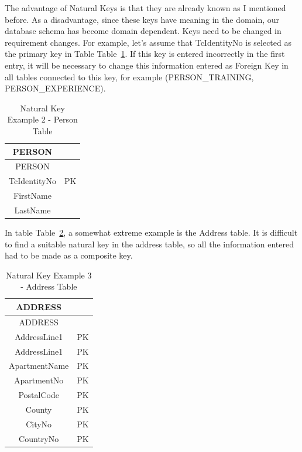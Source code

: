 \documentclass[
  letterpaper,
  DIV=11,
  numbers=noendperiod]{scrreprt}
\begin{document}
The advantage of Natural Keys is that they are already known as I
mentioned before. As a disadvantage, since these keys have meaning in
the domain, our database schema has become domain dependent. Keys need
to be changed in requirement changes. For example, let's assume that
TcIdentityNo is selected as the primary key in Table
Table~\ref{tbl-table-primary-key-natural-key-example-person}. If this
key is entered incorrectly in the first entry, it will be necessary to
change this information entered as Foreign Key in all tables connected
to this key, for example (PERSON\_TRAINING, PERSON\_EXPERIENCE).

\begin{longtable}[]{@{}cc@{}}
\caption{Natural Key Example 2 - Person
Table}\label{tbl-table-primary-key-natural-key-example-person}\tabularnewline
\toprule\noalign{}
PERSON & \\
\midrule\noalign{}
\endfirsthead
\toprule\noalign{}
PERSON & \\
\midrule\noalign{}
\endhead
\bottomrule\noalign{}
\endlastfoot
TcIdentityNo & PK \\
FirstName & \\
LastName & \\
\end{longtable}

In table
Table~\ref{tbl-table-primary-key-natural-key-example-address-table}, a
somewhat extreme example is the Address table. It is difficult to find a
suitable natural key in the address table, so all the information
entered had to be made as a composite key.

\begin{longtable}[]{@{}cc@{}}
\caption{Natural Key Example 3 - Address
Table}\label{tbl-table-primary-key-natural-key-example-address-table}\tabularnewline
\toprule\noalign{}
ADDRESS & \\
\midrule\noalign{}
\endfirsthead
\toprule\noalign{}
ADDRESS & \\
\midrule\noalign{}
\endhead
\bottomrule\noalign{}
\endlastfoot
AddressLine1 & PK \\
AddressLine1 & PK \\
ApartmentName & PK \\
ApartmentNo & PK \\
PostalCode & PK \\
County & PK \\
CityNo & PK \\
CountryNo & PK \\
\end{longtable}
\end{document}
